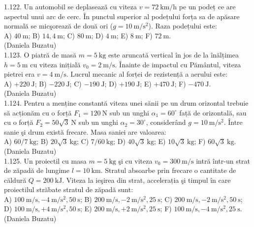 1.122. Un automobil se deplasează cu viteza $v=72 \mathrm{~km} / \mathrm{h}$ pe un podeț ce are aspectul unui arc de cerc. În punctul superior al podețului forța sa de apăsare normală se micşorează de două ori ($g=10 \mathrm{~m} / \mathrm{s}^{2}$). Raza podețului este:\\ A) $40 \mathrm{~m}$; B) $14,4 \mathrm{~m}$; C) $80 \mathrm{~m}$; D) $4 \mathrm{~m}$; E) $8 \mathrm{~m}$; F) $72 \mathrm{~m}$.\\ (Daniela Buzatu)\\

1.123. O piatră de masă $m=5 \mathrm{~kg}$ este aruncată vertical în jos de la înălțimea $h=5 \mathrm{~m}$ cu viteza inițială $v_{0}=2 \mathrm{~m} / \mathrm{s}$. Înainte de impactul cu Pământul, viteza pietrei era $v=4 \mathrm{~m} / \mathrm{s}$. Lucrul mecanic al forței de rezistență a aerului este:\\ A) $+220 \mathrm{~J}$; B) $-220 \mathrm{~J}$; C) $-190 \mathrm{~J}$; D) $+190 \mathrm{~J}$; E) $+470 \mathrm{~J}$; F) $-470 \mathrm{~J}$.\\ (Daniela Buzatu)\\

1.124. Pentru a menține constantă viteza unei sănii pe un drum orizontal trebuie să acționăm cu o forță $F_{1}=120 \mathrm{~N}$ sub un unghi $\alpha_{1}=60^{\circ}$ față de orizontală, sau cu o forță $F_{2}=50 \sqrt{3} \mathrm{~N}$ sub un unghi $\alpha_{2}=30^{\circ}$, considerând $g=10 \mathrm{~m} / \mathrm{s}^{2}$. Între sanie şi drum există frecare. Masa saniei are valoarea:\\ A) $60 / 7 \mathrm{~kg}$; B) $20 \sqrt{3} \mathrm{~kg}$; C) $7 / 60 \mathrm{~kg}$; D) $40 \sqrt{3} \mathrm{~kg}$; E) $10 \sqrt{3} \mathrm{~kg}$; F) $60 \sqrt{3} \mathrm{~kg}$.\\ (Daniela Buzatu)\\

1.125. Un proiectil cu masa $m=5 \mathrm{~kg}$ şi cu viteza $v_{0}=300 \mathrm{~m} / \mathrm{s}$ intră într-un strat de zăpadă de lungime $l=10 \mathrm{~km}$. Stratul absoarbe prin frecare o cantitate de căldură $Q=200 \mathrm{~kJ}$. Viteza la ieşirea din strat, accelerația şi timpul în care proiectilul străbate stratul de zăpadă sunt:\\ A) $100 \mathrm{~m} / \mathrm{s}, -4 \mathrm{~m} / \mathrm{s}^{2}, 50 \mathrm{~s}$; B) $200 \mathrm{~m} / \mathrm{s}, -2 \mathrm{~m} / \mathrm{s}^{2}, 25 \mathrm{~s}$; C) $200 \mathrm{~m} / \mathrm{s}, -2 \mathrm{~m} / \mathrm{s}^{2}, 50 \mathrm{~s}$; D) $100 \mathrm{~m} / \mathrm{s}, +4 \mathrm{~m} / \mathrm{s}^{2}, 50 \mathrm{~s}$; E) $200 \mathrm{~m} / \mathrm{s}, +2 \mathrm{~m} / \mathrm{s}^{2}, 25 \mathrm{~s}$; F) $100 \mathrm{~m} / \mathrm{s}, -4 \mathrm{~m} / \mathrm{s}^{2}, 25 \mathrm{~s}$.\\ (Daniela Buzatu)\\

